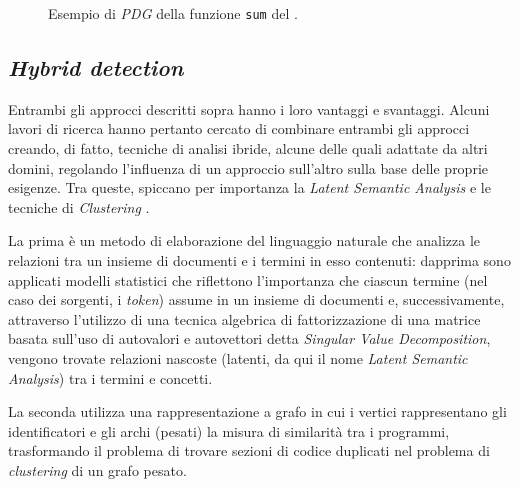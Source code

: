 

\begin{figure}[h!]
    \caption{Esempio di \textit{PDG} della funzione \texttt{sum} del .}
    \label{img:01-pdg}
\end{figure}

\subsection{\textit{Hybrid detection}}
Entrambi gli approcci descritti sopra hanno i loro vantaggi e svantaggi. 
%
Alcuni lavori di ricerca hanno pertanto cercato di combinare entrambi gli approcci creando, di fatto, tecniche di analisi ibride, alcune delle quali adattate da altri domini, regolando l'influenza di un approccio sull'altro sulla base delle proprie esigenze.
%
Tra queste, spiccano per importanza la \textit{Latent Semantic Analysis} \cite{lsa} e le tecniche di \textit{Clustering} \cite{pdectet}.

La prima è un metodo di elaborazione del linguaggio naturale che analizza le relazioni tra un insieme di documenti e i termini in esso contenuti: dapprima sono applicati modelli statistici che riflettono l'importanza che ciascun termine (nel caso dei sorgenti, i \textit{token}) assume in un insieme di documenti e, successivamente, attraverso l'utilizzo di una tecnica algebrica di fattorizzazione di una matrice basata sull'uso di autovalori e autovettori detta \textit{Singular Value Decomposition}, vengono trovate relazioni nascoste (latenti, da qui il nome \textit{Latent Semantic Analysis}) tra i termini e concetti.

La seconda utilizza una rappresentazione a grafo in cui i vertici rappresentano gli identificatori e gli archi (pesati) la misura di similarità tra i programmi, trasformando il problema di trovare sezioni di codice duplicati nel problema di \textit{clustering} di un grafo pesato.

